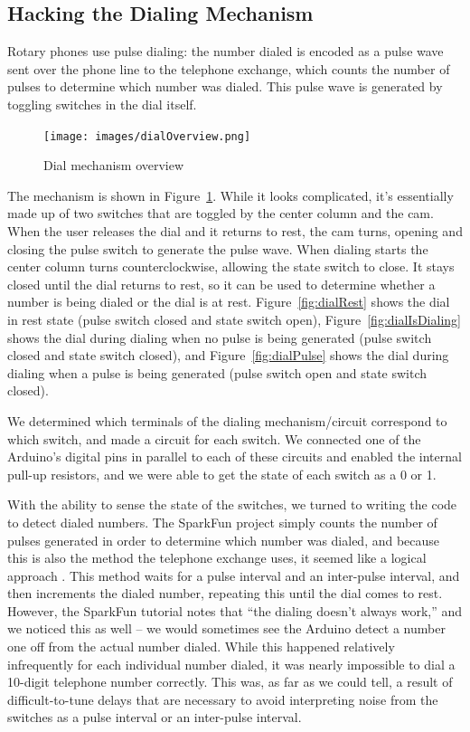 \documentclass{es50report}
\begin{document}
    \subsection{Hacking the Dialing Mechanism}
    Rotary phones use pulse dialing: the number dialed is encoded as a pulse wave sent over the phone line to the telephone exchange, which counts the number of pulses to determine which number was dialed. This pulse wave is generated by toggling switches in the dial itself.

    \begin{figure}
        \centering
        \texttt{[image: images/dialOverview.png]}
        \caption{Dial mechanism overview}\label{fig:dialOverview}
    \end{figure}

    The mechanism is shown in Figure~\ref{fig:dialOverview}. While it looks complicated, it's essentially made up of two switches that are toggled by the center column and the cam. When the user releases the dial and it returns to rest, the cam turns, opening and closing the pulse switch to generate the pulse wave. When dialing starts the center column turns counterclockwise, allowing the state switch to close. It stays closed until the dial returns to rest, so it can be used to determine whether a number is being dialed or the dial is at rest. Figure~\ref{fig:dialRest} shows the dial in rest state (pulse switch closed and state switch open), Figure~\ref{fig:dialIsDialing} shows the dial during dialing when no pulse is being generated (pulse switch closed and state switch closed), and Figure~\ref{fig:dialPulse} shows the dial during dialing when a pulse is being generated (pulse switch open and state switch closed).

    We determined which terminals of the dialing mechanism/circuit correspond to which switch, and made a circuit for each switch. We connected one of the Arduino's digital pins in parallel to each of these circuits and enabled the internal pull-up resistors, and we were able to get the state of each switch as a 0 or 1.

    With the ability to sense the state of the switches, we turned to writing the code to detect dialed numbers. The SparkFun project simply counts the number of pulses generated in order to determine which number was dialed, and because this is also the method the telephone exchange uses, it seemed like a logical approach \cite{seidle05}. This method waits for a pulse interval and an inter-pulse interval, and then increments the dialed number, repeating this until the dial comes to rest. However, the SparkFun tutorial notes that ``the dialing doesn't always work,'' and we noticed this as well -- we would sometimes see the Arduino detect a number one off from the actual number dialed. While this happened relatively infrequently for each individual number dialed, it was nearly impossible to dial a 10-digit telephone number correctly. This was, as far as we could tell, a result of difficult-to-tune delays that are necessary to avoid interpreting noise from the switches as a pulse interval or an inter-pulse interval.
\end{document}
